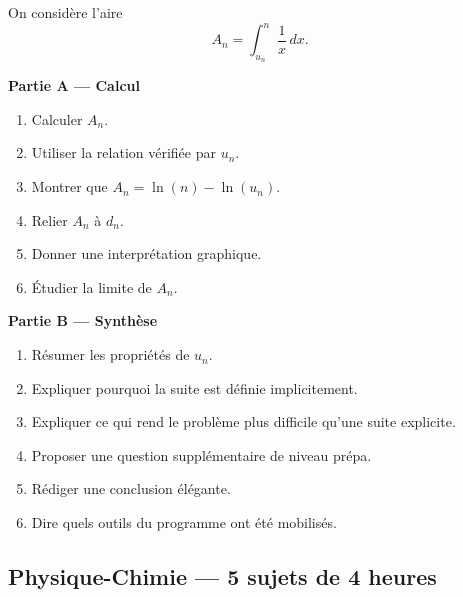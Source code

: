 \documentclass[11pt,a4paper]{article}
\begin{document}
\begin{difficile}
On considère l'aire
\[
A_n=\int_{u_n}^{n}\frac{1}{x}\,dx.
\]

\textbf{Partie A — Calcul}
\begin{enumerate}
  \item Calculer $A_n$.
  \item Utiliser la relation vérifiée par $u_n$.
  \item Montrer que $A_n=\ln(n)-\ln(u_n)$.
  \item Relier $A_n$ à $d_n$.
  \item Donner une interprétation graphique.
  \item Étudier la limite de $A_n$.
\end{enumerate}

\textbf{Partie B — Synthèse}
\begin{enumerate}
  \item Résumer les propriétés de $u_n$.
  \item Expliquer pourquoi la suite est définie implicitement.
  \item Expliquer ce qui rend le problème plus difficile qu'une suite explicite.
  \item Proposer une question supplémentaire de niveau prépa.
  \item Rédiger une conclusion élégante.
  \item Dire quels outils du programme ont été mobilisés.
\end{enumerate}
\end{difficile}

\subsection{Physique-Chimie — 5 sujets de 4 heures}
\end{document}
